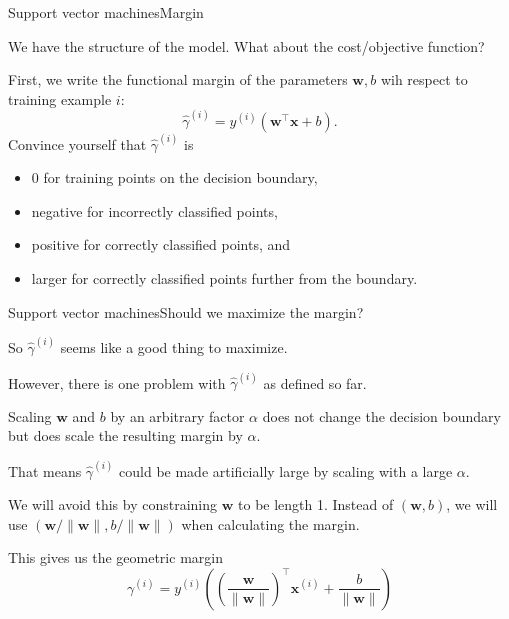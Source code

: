 \documentclass{beamer}
\renewcommand{\vec}[1]{\boldsymbol{#1}}
\begin{document}
\begin{frame}{Support vector machines}{Margin}

  We have the structure of the model. What about the cost/objective function?

  \medskip

  First, we write the \alert{functional margin} of the parameters
  $\vec{w},b$ wih respect to training example $i$:
  \[ \hat{\gamma}^{(i)} = y^{(i)}(\vec{w}^\top\vec{x}+b) . \]
  Convince yourself that $\hat{\gamma}^{(i)}$ is
  \begin{itemize}
    \item 0 for training points on
      the decision boundary,
    \item negative for incorrectly classified points,
    \item positive for correctly classified points, and
    \item larger for correctly classified points further from the
      boundary.
  \end{itemize}

\end{frame}


\begin{frame}{Support vector machines}{Should we maximize the margin?}

  So $\hat{\gamma}^{(i)}$ seems like a good thing to maximize.

  \medskip

  However, there is one problem with $\hat{\gamma}^{(i)}$ as defined so far.

  \medskip

  \alert{Scaling} $\vec{w}$ and $b$ by an arbitrary factor $\alpha$
  does not change the decision boundary but does scale the resulting
  margin by $\alpha$.

  \medskip

  That means $\hat{\gamma}^{(i)}$ could be made artificially large by
  scaling with a large $\alpha$.

  \medskip

  We will avoid this by constraining $\vec{w}$ to be length 1. Instead
  of $(\vec{w},b)$, we will use $(\vec{w}/\|\vec{w}\|,b/\|\vec{w}\|)$
  when calculating the margin.

  \medskip

  This gives us the \alert{geometric margin}
  \[ \gamma^{(i)} = y^{(i)}\left( \left(\frac{\vec{w}}{\|\vec{w}\|}\right)^\top\vec{x}^{(i)} + \frac{b}{\|\vec{w}\|} \right) \]

\end{frame}
\end{document}
